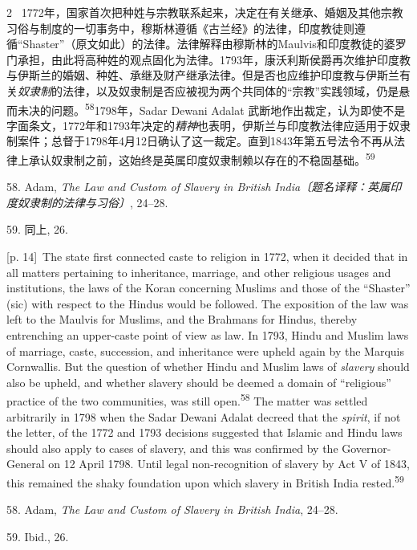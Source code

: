 \documentclass[10pt,a4paper]{article}
\begin{document}
\begin{paracol}{2}
\switchcolumn*
{\scriptsize\color{gray} [p. 14]}\ 1772年，国家首次把种姓与宗教联系起来，决定在有关继承、婚姻及其他宗教习俗与制度的一切事务中，穆斯林遵循《古兰经》的法律，印度教徒则遵循“Shaster”（原文如此）的法律。法律解释由穆斯林的Maulvis和印度教徒的婆罗门承担，由此将高种姓的观点固化为法律。1793年，康沃利斯侯爵再次维护印度教与伊斯兰的婚姻、种姓、承继及财产继承法律。但是否也应维护印度教与伊斯兰有关\textit{奴隶制}的法律，以及奴隶制是否应被视为两个共同体的“宗教”实践领域，仍是悬而未决的问\mbox{题。\textsuperscript{58}}1798年，Sadar Dewani Adalat 武断地作出裁定，认为即使不是字面条文，1772年和1793年决定的\textit{精神}也表明，伊斯兰与印度教法律应适用于奴隶制案件；总督于1798年4月12日确认了这一裁定。直到1843年第五号法令不再从法律上承认奴隶制之前，这始终是英属印度奴隶制赖以存在的不稳固基\mbox{础。\textsuperscript{59}}\par{\small 58. Adam, \textit{The Law and Custom of Slavery in British India〔题名译释：英属印度奴隶制的法律与习俗〕}, 24–28.\par}{\small 59. 同上, 26.\par}
\switchcolumn
{\scriptsize\color{gray} [p. 14]}\ The state first connected caste to religion in 1772, when it decided that in all matters pertaining to inheritance, marriage, and other religious usages and institutions, the laws of the Koran concerning Muslims and those of the “Shaster” (sic) with respect to the Hindus would be followed. The exposition of the law was left to the Maulvis for Muslims, and the Brahmans for Hindus, thereby entrenching an upper-caste point of view as law. In 1793, Hindu and Muslim laws of marriage, caste, succession, and inheritance were upheld again by the Marquis Cornwallis. But the question of whether Hindu and Muslim laws of \textit{slavery} should also be upheld, and whether slavery should be deemed a domain of “religious” practice of the two communities, was still open.\nobreak\textsuperscript{58} The matter was settled arbitrarily in 1798 when the Sadar Dewani Adalat decreed that the \textit{spirit}, if not the letter, of the 1772 and 1793 decisions suggested that Islamic and Hindu laws should also apply to cases of slavery, and this was confirmed by the Governor-General on 12 April 1798. Until legal non-recognition of slavery by Act V of 1843, this remained the shaky foundation upon which slavery in British India rested.\nobreak\textsuperscript{59}\par{\small 58. Adam, \textit{The Law and Custom of Slavery in British India}, 24–28.\par}{\small 59. Ibid., 26.\par}

\end{paracol}
\end{document}
